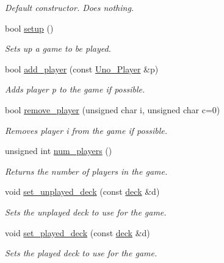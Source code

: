 \begin{DoxyCompactItemize}
\begin{DoxyCompactList}\small\item\em \-Default constructor. \-Does nothing. \end{DoxyCompactList}\item 
bool \hyperlink{class_uno___runner_ae015517f7d4493ddbaaeacd98be0b9b8}{setup} ()
\begin{DoxyCompactList}\small\item\em \-Sets up a game to be played. \end{DoxyCompactList}\item 
bool \hyperlink{class_uno___runner_a982f614c5afa8faa57aedc3116f3d237}{add\-\_\-player} (const \hyperlink{class_uno___player}{\-Uno\-\_\-\-Player} \&p)
\begin{DoxyCompactList}\small\item\em \-Adds player p to the game if possible. \end{DoxyCompactList}\item 
bool \hyperlink{class_uno___runner_acae1277934b338e4c6edd8d45eea5a3e}{remove\-\_\-player} (unsigned char i, unsigned char c=0)
\begin{DoxyCompactList}\small\item\em \-Removes player i from the game if possible. \end{DoxyCompactList}\item 
unsigned int \hyperlink{class_uno___runner_aa3f43b6ab9042ff74a34ad3fae8a0b11}{num\-\_\-players} ()
\begin{DoxyCompactList}\small\item\em \-Returns the number of players in the game. \end{DoxyCompactList}\item 
void \hyperlink{class_uno___runner_a79c386fc295240e53b20c1270f31ab41}{set\-\_\-unplayed\-\_\-deck} (const \hyperlink{uno__deck_8h_ab634a15f4d19d3af113a71241b79c408}{deck} \&d)
\begin{DoxyCompactList}\small\item\em \-Sets the unplayed deck to use for the game. \end{DoxyCompactList}\item 
void \hyperlink{class_uno___runner_ac98c68091701dcf1deeaad7a5168dec8}{set\-\_\-played\-\_\-deck} (const \hyperlink{uno__deck_8h_ab634a15f4d19d3af113a71241b79c408}{deck} \&d)
\begin{DoxyCompactList}\small\item\em \-Sets the played deck to use for the game. \end{DoxyCompactList}\item 

\end{DoxyCompactItemize}
